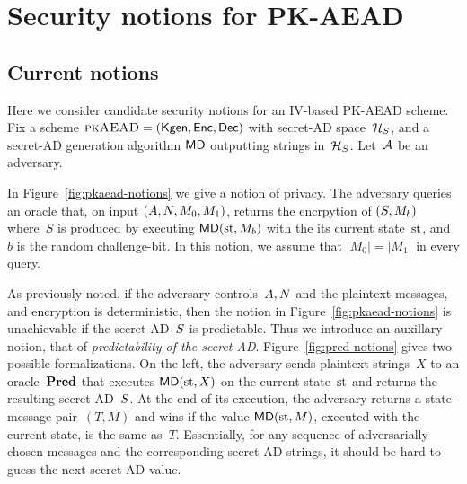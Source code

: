 
\section{Security notions for PK-AEAD} 
\subsection{Current notions}
Here we consider candidate security notions for an IV-based PK-AEAD scheme.  Fix a scheme $\textsc{pkAEAD}=(\mathsf{Kgen},{\mathsf{Enc}},{\mathsf{Dec}})$ with secret-AD space~$\mathcal{H}_S$, and a secret-AD generation algorithm $\mathsf{MD}$ outputting strings in~$\mathcal{H}_S$.  Let~${\cal A}$ be an adversary.  

In Figure~\ref{fig:pkaead-notions} we give a notion of privacy.  The adversary queries an oracle that, on input $(A,N,M_0,M_1)$, returns the encrpytion of $(S,M_b)$ where~$S$ is produced by executing $\mathsf{MD}(\mathrm{st},M_b)$ with the its current state~$\mathrm{st}$, and~$b$ is the random challenge-bit.  In this notion, we assume that $|M_0|=|M_1|$ in every query.

As previously noted, if the adversary controls~$A, N$ and the plaintext messages, and encryption is deterministic, then the notion in Figure~\ref{fig:pkaead-notions} is unachievable if the secret-AD~$S$ is predictable. Thus we introduce an auxillary notion, that of \textit{predictability of the secret-AD}.  Figure~\ref{fig:pred-notions} gives two possible formalizations.  On the left, the adversary sends plaintext strings~$X$ to an oracle~$\textbf{Pred}$ that executes $\mathsf{MD}(\mathrm{st},X)$ on the current state~$\mathrm{st}$ and returns the resulting secret-AD~$S$.  At the end of its execution, the adversary returns a state-message pair~$(T,M)$ and wins if the value $\mathsf{MD}(\mathrm{st},M)$, executed with the current state, is the same as~$T$.  Essentially, for any sequence of adversarially chosen messages and the corresponding secret-AD strings, it should be hard to guess the next secret-AD value. 

